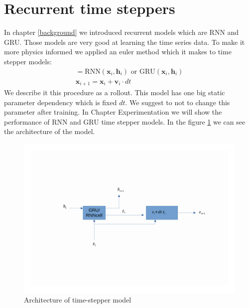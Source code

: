\section{Recurrent time steppers}
In chapter \ref{background}  we introduced recurrent models which are RNN and GRU.
Those models are very good at learning the time series data. To make it more physics informed we applied an euler method which it makes to time stepper models:
\begin{eqnarray}
	[\mathbf{v}_i, \mathbf{h}_{i+1}] = \text{RNN}(\mathbf{x}_i,\mathbf{h}_i) \text{  or  }  \text{GRU}(\mathbf{x}_i,\mathbf{h}_i)\\
	\mathbf{x}_{i+1} = \mathbf{x}_i + \mathbf{v}_i \cdot dt
\end{eqnarray}
We describe it this procedure as a rollout. 
This model has one big static parameter dependency which is fixed $dt$. We suggest to not to change this parameter after training. In Chapter Experimentation we will show the performance of RNN and GRU time stepper models. In the figure \ref{fig:rnn} we can see the architecture of the model.
\begin{figure}[h!]
	\includegraphics[width=15cm]{chapters/chapter4/RNN_stepper}
	
	\caption{Architecture of time-stepper model}
	\label{fig:rnn}
\end{figure}



